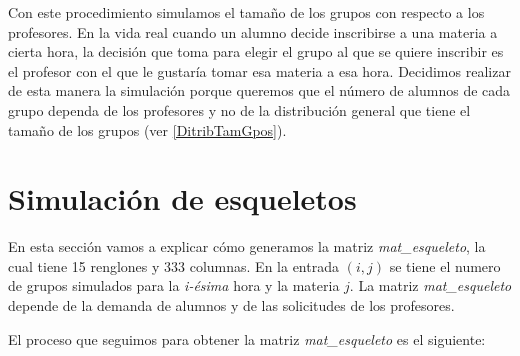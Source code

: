 Con este procedimiento simulamos el tamaño de los grupos con respecto a los profesores. En la vida real cuando un alumno decide inscribirse a una materia a cierta hora, la decisión que toma para elegir el grupo al que se quiere inscribir es el profesor con el que le gustaría tomar esa materia a esa hora. Decidimos realizar de esta manera la simulación porque queremos que el número de alumnos de cada grupo dependa de los profesores y no de la distribución general que tiene el tamaño de los grupos (ver \ref{DitribTamGpos}).





\section{Simulación de esqueletos}

En esta sección vamos a explicar cómo generamos la matriz \textit{mat\_esqueleto}, la cual tiene 15 renglones y 333 columnas. En la entrada $(i,j)$ se tiene el numero de grupos simulados para la \textit{i-ésima} hora y la materia $j$. La matriz \textit{mat\_esqueleto} depende de la demanda de alumnos y de las solicitudes de los profesores.

El proceso que seguimos para obtener la matriz \textit{mat\_esqueleto} es el siguiente:

